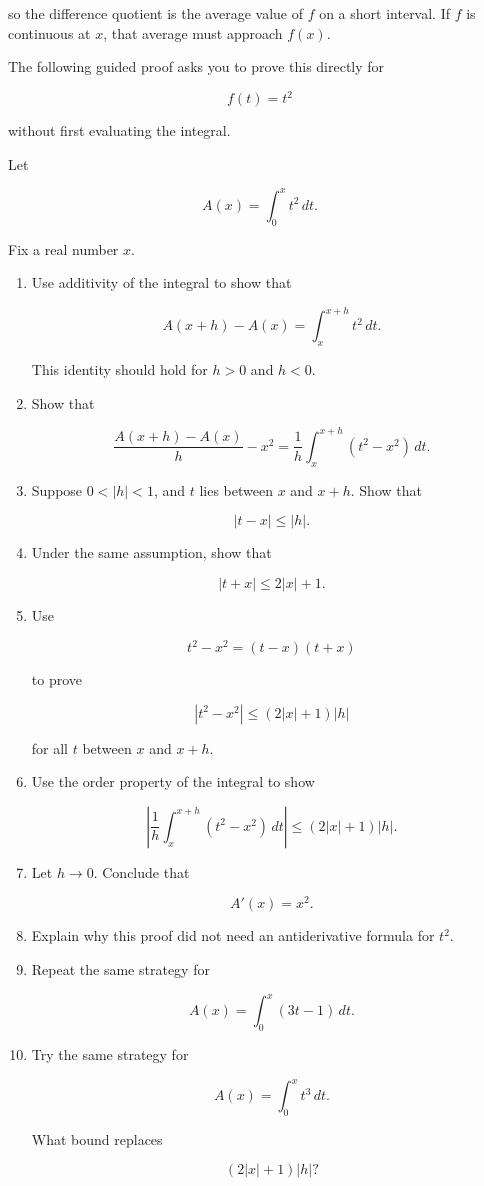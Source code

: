 so the difference quotient is the average value of \(f\) on a short interval.  If \(f\) is
continuous at \(x\), that average must approach \(f(x)\).

The following guided proof asks you to prove this directly for

\[
f(t)=t^2
\]

without first evaluating the integral.

Let

\[
A(x)=\int_0^x t^2\,dt.
\]

Fix a real number \(x\).

\begin{enumerate}
\item Use additivity of the integral to show that

\[
A(x+h)-A(x)=\int_x^{x+h} t^2\,dt.
\]

This identity should hold for \(h>0\) and \(h<0\).

\item Show that

\[
\frac{A(x+h)-A(x)}{h}-x^2
=
\frac1h\int_x^{x+h}(t^2-x^2)\,dt.
\]

\item Suppose \(0<|h|<1\), and \(t\) lies between \(x\) and \(x+h\).  Show that

\[
|t-x|\le |h|.
\]

\item Under the same assumption, show that

\[
|t+x|\le 2|x|+1.
\]

\item Use

\[
t^2-x^2=(t-x)(t+x)
\]

to prove

\[
|t^2-x^2|\le (2|x|+1)|h|
\]

for all \(t\) between \(x\) and \(x+h\).

\item Use the order property of the integral to show

\[
\left|
\frac1h\int_x^{x+h}(t^2-x^2)\,dt
\right|
\le
(2|x|+1)|h|.
\]

\item Let \(h\to0\).  Conclude that

\[
A'(x)=x^2.
\]

\item Explain why this proof did not need an antiderivative formula for \(t^2\).

\item Repeat the same strategy for

\[
A(x)=\int_0^x (3t-1)\,dt.
\]

\item Try the same strategy for

\[
A(x)=\int_0^x t^3\,dt.
\]

What bound replaces

\[
(2|x|+1)|h|?
\]

\end{enumerate}

